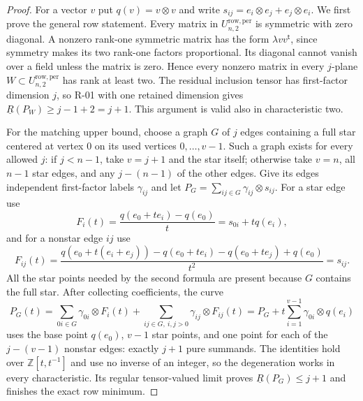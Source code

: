 \begin{proof}
For a vector $v$ put $q(v)=v\otimes v$ and write
$s_{ij}=e_i\otimes e_j+e_j\otimes e_i$.
We first prove the general row statement.
Every matrix in $U^{\mathrm{row,per}}_{n,2}$ is symmetric with zero
diagonal.  A nonzero rank-one symmetric matrix has the form
$\lambda vv^{\mathsf t}$, since symmetry makes its two rank-one
factors proportional.  Its diagonal cannot vanish over a field unless
the matrix is zero.  Hence every nonzero matrix in every $j$-plane
$W\subset U^{\mathrm{row,per}}_{n,2}$ has rank at least two.
The residual inclusion tensor has first-factor dimension $j$, so
R-01 with one retained dimension gives
$\underline R(P_W)\ge j-1+2=j+1$.  This argument is valid also in
characteristic two.

For the matching upper bound, choose a graph $G$ of $j$ edges containing
a full star centered at vertex $0$ on its used vertices
$0,\ldots,v-1$.  Such a graph exists for every allowed $j$:
if $j<n-1$, take $v=j+1$ and the star itself; otherwise take $v=n$,
all $n-1$ star edges, and any $j-(n-1)$ of the other edges.
Give its edges independent first-factor labels $\gamma_{ij}$ and let
$P_G=\sum_{ij\in G}\gamma_{ij}\otimes s_{ij}$.
For a star edge use
\[
 F_i(t)=\frac{q(e_0+t e_i)-q(e_0)}t=s_{0i}+tq(e_i),
\]
and for a nonstar edge $ij$ use
\[
 F_{ij}(t)=\frac{q(e_0+t(e_i+e_j))-q(e_0+t e_i)
       -q(e_0+t e_j)+q(e_0)}{t^2}=s_{ij}.
\]
All the star points needed by the second formula are present because
$G$ contains the full star.  After collecting coefficients, the curve
\[
 P_G(t)=\sum_{0i\in G}\gamma_{0i}\otimes F_i(t)
          +\sum_{ij\in G,\ i,j>0}\gamma_{ij}\otimes F_{ij}(t)
       =P_G+t\sum_{i=1}^{v-1}\gamma_{0i}\otimes q(e_i)
\]
uses the base point $q(e_0)$, $v-1$ star points, and one point for
each of the $j-(v-1)$ nonstar edges: exactly $j+1$ pure summands.
The identities hold over $\mathbb Z[t,t^{-1}]$ and use no inverse of
an integer, so the degeneration works in every characteristic.
Its regular tensor-valued limit proves
$\underline R(P_G)\le j+1$ and finishes the exact row minimum.


\end{proof}
